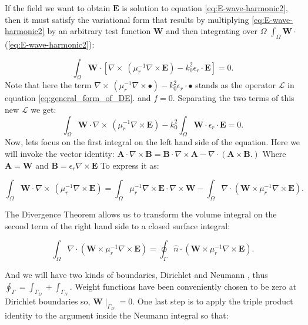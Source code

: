 If the field we want to obtain $\mathbf{E}$ is solution to equation \ref{eq:E-wave-harmonic2}, then it must satisfy the variational form that results by multiplying \ref{eq:E-wave-harmonic2} by an arbitrary test function $\mathbf{W}$ and then integrating over $\Omega$ $\int_{\Omega} \mathbf{W} \cdot$(\ref{eq:E-wave-harmonic2}):

\begin{equation}
\int_{\Omega}\mathbf{W}\cdot\left[ \nabla\times\ \left(\mu_r^{-1}\nabla\times \mathbf{E} \right) - k_0^{2}\epsilon_r\cdot \mathbf{E}\right]= 0. \label{eq:E-wave-harmonic3} 
\end{equation}
Note that here the term $\nabla\times\ \left(\mu_r^{-1}\nabla\times \bullet \right) - k_0^{2}\epsilon_r\cdot \bullet$ stands as the operator $\mathcal{L}$ in equation \ref{eq:general_form_of_DE}. and $f=0$. Separating the two terms of this new $\mathcal{L}$ we get:
\begin{equation}
\int_{\Omega}\mathbf{W}\cdot \nabla\times\ \left(\mu_r^{-1}\nabla\times \mathbf{E} \right) -k_0^{2}\int_{\Omega}\mathbf{W}\cdot \epsilon_r\cdot \mathbf{E}= 0. \label{eq:E-wave-harmonic4} 
\end{equation}
Now, lets focus on the first integral on the left hand side of the equation. Here we will invoke the vector identity: $\mathbf{A}\cdot\nabla\times\mathbf{B} = \mathbf{B}\cdot\nabla\times\mathbf{A} - \nabla\cdot(\mathbf{A}\times\mathbf{B}.)$ 
Where $\mathbf{A}=\mathbf{W}$ and $\mathbf{B}=\epsilon_r\nabla\times \mathbf{E}$ To express it as:

\begin{equation}
\int_{\Omega}\mathbf{W}\cdot \nabla\times\ \left(\mu_r^{-1}\nabla\times \mathbf{E} \right) = \int_{\Omega} \mu_r^{-1}\nabla\times \mathbf{E}\cdot \nabla\times\mathbf{W}-\int_{\Omega}\nabla\cdot
\left(\mathbf{W}\times\mu_r^{-1}\nabla\times\mathbf{E}\right). 
\end{equation}

The Divergence Theorem allows us to transform the volume integral on the second term of the right hand side to a closed surface integral:

\begin{equation}
\int_{\Omega}\nabla\cdot
\left(\mathbf{W}\times\mu_r^{-1}\nabla\times\mathbf{E}
\right) = \oint_{\Gamma}\hat{n}\cdot
\left(\mathbf{W}\times\mu_r^{-1}\nabla\times\mathbf{E}
\right).
\end{equation}

And we will have two kinds of boundaries, Dirichlet and Neumann \cite{Garcia2011}, thus $\oint_{\Gamma} = \int_{\Gamma_D}+\int_{\Gamma_N}$. Weight functions have been conveniently chosen to be zero at Dirichlet boundaries so, $\mathbf{W}\mid_{\Gamma_D}=0$. 
One last step is to apply the triple product identity to the argument inside the Neumann integral so that:

